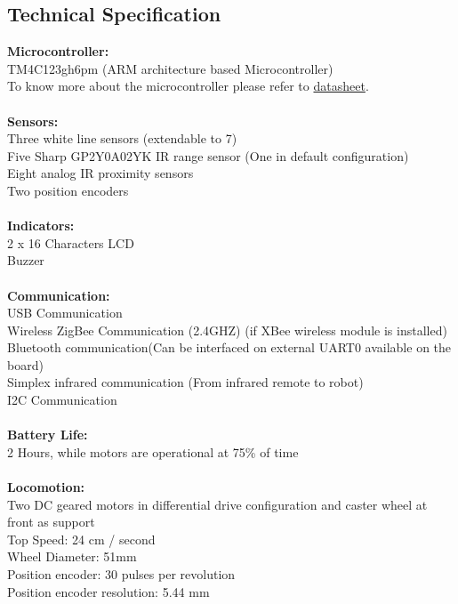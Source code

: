 \documentclass[a4paper,10pt,oneside]{article}
\begin{document}
{		\subsection{{\huge \textbf{Technical Specification}}\\}
			{\textbf{Microcontroller:\\}
			TM4C123gh6pm (ARM architecture based Microcontroller)\\ To know more about the microcontroller please refer to \href{www.ti.com/lit/gpn/tm4c123gh6pm}{datasheet}.\\ \\}
			{\textbf{Sensors:}\\
			Three white line sensors (extendable to 7)\\
			Five Sharp GP2Y0A02YK IR range sensor (One in default configuration)\\
			Eight analog IR proximity sensors\\
			Two position encoders\\\\} 
			\textbf{Indicators:\\}
			{2 x 16 Characters LCD\\
			Buzzer\\\\}
			\textbf{Communication:\\}
			{USB Communication\\
			Wireless ZigBee Communication (2.4GHZ) (if XBee wireless module is installed)\\
			Bluetooth communication(Can be interfaced on external UART0 available on the board)\\
			Simplex infrared communication (From infrared remote to robot)\\
			I2C Communication \\\\}
			\textbf{Battery Life:\\}
			{2 Hours, while motors are operational at 75\% of time\\\\}
			\textbf{Locomotion:\\}
			{Two DC geared motors in differential drive configuration and caster wheel at front as support\\
			Top Speed: 24 cm / second\\
			Wheel Diameter: 51mm\\
			Position encoder: 30 pulses per revolution\\
			Position encoder resolution: 5.44 mm\\\\}
}
\end{document}

